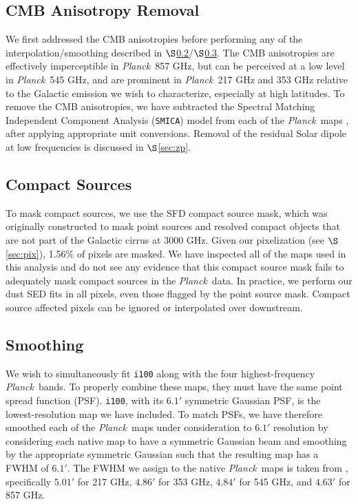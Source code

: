 \documentclass{emulateapj}
\newcommand{\PLANCK}{{\it Planck}}
\begin{document}
\subsection{CMB Anisotropy Removal}
\label{sec:cmb}
We first addressed the CMB anisotropies before performing any of the 
interpolation/smoothing described in $\S$\ref{sec:ptsrc}/$\S$\ref{sec:smth}. 
The CMB anisotropies are effectively imperceptible in \PLANCK~857 GHz, but can 
be perceived at a low level in \PLANCK~545 GHz, and are prominent in 
\PLANCK~217 GHz and 353 GHz relative to the Galactic emission we wish to 
characterize, especially at high latitudes. To remove the CMB anisotropies, we 
have subtracted the Spectral Matching Independent Component Analysis 
(\verb|SMICA|) model from each of the \PLANCK~maps \citep{smica}, after 
applying appropriate unit conversions. Removal of the residual Solar dipole at 
low frequencies is discussed in $\S$\ref{sec:zp}.

\subsection{Compact Sources}
\label{sec:ptsrc}
To mask compact sources, we use the SFD compact source mask, which was 
originally constructed to mask point sources and resolved compact objects
that are not part of the Galactic cirrus at 3000 GHz. Given our pixelization 
(see $\S$\ref{sec:pix}), 1.56\% of pixels are masked. We have inspected all of 
the maps used in this analysis and do not see any evidence that this compact 
source mask fails to adequately mask compact sources in the \PLANCK~data. In 
practice, we perform our dust SED fits in all pixels, even those flagged by 
the point source mask. Compact source affected pixels can be ignored or 
interpolated over downstream.

\subsection{Smoothing}
\label{sec:smth}
We wish to simultaneously fit \verb|i100| along with the four 
highest-frequency \PLANCK~bands. To properly combine these maps, they must have
 the same point spread function (PSF). \verb|i100|, with its $6.1'$ symmetric 
Gaussian PSF, is the lowest-resolution map we have included. To match PSFs, we 
have therefore smoothed each of the \PLANCK~maps under consideration to $6.1'$ 
resolution by considering each native map to have a symmetric Gaussian beam and
 smoothing by the appropriate symmetric Gaussian such that the resulting map 
has a FWHM of $6.1'$. The FWHM we assign to the native \PLANCK~maps is taken 
from \cite{planckbeam}, specifically $5.01'$ for 217 GHz, $4.86'$ for 353 GHz, 
$4.84'$ for 545 GHz, and $4.63'$ for 857 GHz.
\end{document}

